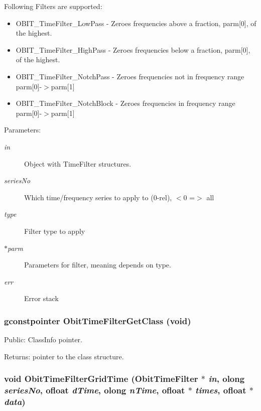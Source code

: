 Following Filters are supported: \begin{itemize}
\item OBIT\_\-Time\-Filter\_\-Low\-Pass - Zeroes frequencies above a fraction, parm[0], of the highest. \item OBIT\_\-Time\-Filter\_\-High\-Pass - Zeroes frequencies below a fraction, parm[0], of the highest. \item OBIT\_\-Time\-Filter\_\-Notch\-Pass - Zeroes frequencies not in frequency range parm[0]-$>$parm[1] \item OBIT\_\-Time\-Filter\_\-Notch\-Block - Zeroes frequencies in frequency range parm[0]-$>$parm[1]\end{itemize}
\begin{Desc}
\item[Parameters:]
\begin{description}
\item[{\em in}]Object with Time\-Filter structures. \item[{\em series\-No}]Which time/frequency series to apply to (0-rel), $<$0 =$>$ all \item[{\em type}]Filter type to apply \item[{\em $\ast$parm}]Parameters for filter, meaning depends on type. \item[{\em err}]Error stack \end{description}
\end{Desc}
\subsubsection{\setlength{\rightskip}{0pt plus 5cm}gconstpointer Obit\-Time\-Filter\-Get\-Class (void)}\label{ObitTimeFilter_8h_a18}


Public: Class\-Info pointer. 

\begin{Desc}
\item[Returns:]pointer to the class structure. \end{Desc}
\subsubsection{\setlength{\rightskip}{0pt plus 5cm}void Obit\-Time\-Filter\-Grid\-Time ({\bf Obit\-Time\-Filter} $\ast$ {\em in}, {\bf olong} {\em series\-No}, {\bf ofloat} {\em d\-Time}, {\bf olong} {\em n\-Time}, {\bf ofloat} $\ast$ {\em times}, {\bf ofloat} $\ast$ {\em data})}\label{ObitTimeFilter_8h_a20}


